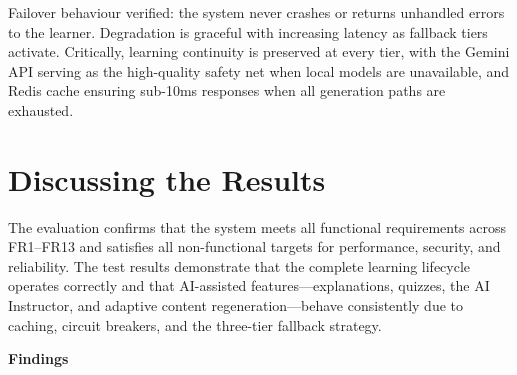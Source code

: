 Failover behaviour verified: the system never crashes or returns unhandled errors to the learner. Degradation is graceful with increasing latency as fallback tiers activate. Critically, learning continuity is preserved at every tier, with the Gemini API serving as the high-quality safety net when local models are unavailable, and Redis cache ensuring sub-10ms responses when all generation paths are exhausted.

\section{Discussing the Results}

The evaluation confirms that the system meets all functional requirements across FR1--FR13 and satisfies all non-functional targets for performance, security, and reliability. The test results demonstrate that the complete learning lifecycle operates correctly and that AI-assisted features---explanations, quizzes, the AI Instructor, and adaptive content regeneration---behave consistently due to caching, circuit breakers, and the three-tier fallback strategy.

\textbf{Findings}


